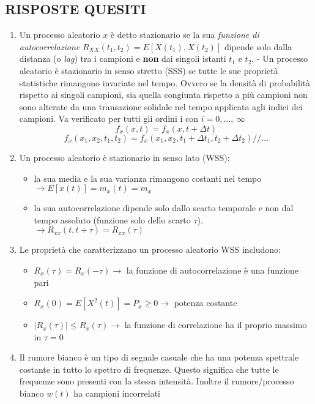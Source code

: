 \documentclass[
]{article}
\begin{document}
\newpage

\subsection{RISPOSTE QUESITI}\label{risposte-quesiti}

\begin{enumerate}
\def\labelenumi{\arabic{enumi}.}
\item
  Un processo aleatorio \(x\) è detto stazionario se la sua
  \emph{funzione di autocorrelazione}
  \(R_{XX}(t_1, t_2) = E[X(t_1), X(t_2)]\) dipende solo dalla distanza
  (o \emph{lag}) tra i campioni e \textbf{non} dai singoli istanti
  \(t_1\) e \(t_2\). - Un processo aleatorio è stazionario in senso
  stretto (SSS) se tutte le sue proprietà statistiche rimangono
  invariate nel tempo. Ovvero se la densità di probabilità rispetto ai
  singoli campioni, sia quella congiunta rispetto a più campioni non
  sono alterate da una transazione solidale nel tempo applicata agli
  indici dei campioni. Va verificato per tutti gli ordini i con
  \(i= 0, \dots, \ \infty\) \[f_x (x, t) = f_x(x, t+ \Delta t)\]
  \[f_x(x_1, x_2, t_1, t_2) = f_x(x_1, x_2, t_1 + \Delta t_1, t_2 + \Delta t_2)
    //
    ...\]
\item
  Un processo aleatorio è stazionario in senso lato (WSS):

  \begin{itemize}
  \item
    la sua media e la sua varianza rimangono costanti nel tempo
    \(\to E[x(t)] = m_x(t) = m_x\)\\
  \item
    la sua autocorrelazione dipende solo dallo scarto temporale e non
    dal tempo assoluto (funzione solo dello scarto \(\tau\)).
    \(\to R_{xx}(t, t+\tau) = R_{xx}(\tau)\)
  \end{itemize}
\item
  Le proprietà che caratterizzano un processo aleatorio WSS includono:

  \begin{itemize}
  \item
    \(R_x(\tau) = R_x(-\tau) \to\) la funzione di autocorrelazione è una
    funzione pari
  \item
    \(R_x(0)= E[X^2(t)] = P_x \geq 0 \to\) potenza costante
  \item
    \(|R_x(\tau)| \leq R_x(\tau) \to\) la funzione di correlazione ha il
    proprio massimo in \(\tau = 0\)
  \end{itemize}
\item
  Il rumore bianco è un tipo di segnale casuale che ha una potenza
  spettrale costante in tutto lo spettro di frequenze. Questo significa
  che tutte le frequenze sono presenti con la stessa intensità. Inoltre
  il rumore/processo bianco \(w(t)\) ha campioni incorrelati


\end{enumerate}
\end{document}
